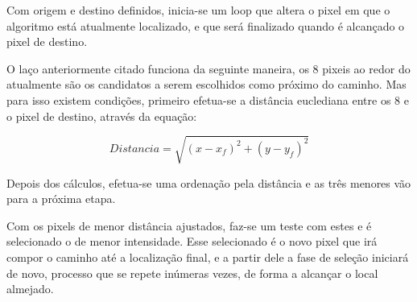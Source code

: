 \documentclass[conference]{IEEEtran}
\begin{document}
Com origem e destino definidos, inicia-se um loop que altera o pixel em que o algoritmo
está atualmente localizado, e que será finalizado quando é alcançado o pixel de destino.

O laço anteriormente citado funciona da seguinte maneira, os 8 pixeis ao redor do atualmente
são os candidatos a serem escolhidos como próximo do caminho. Mas para isso existem condições,
primeiro efetua-se a distância euclediana entre os 8 e o pixel de destino, através da equação:

\begin{equation}
    \label{eq6}
    Distancia = \sqrt{(x - x_{f})^2 + (y - y_{f})^2}
\end{equation}

Depois dos cálculos, efetua-se uma ordenação pela distância e as três menores vão
para a próxima etapa.

Com os pixels de menor distância ajustados, faz-se um teste com estes e é selecionado
o de menor intensidade. Esse selecionado é o novo pixel que irá compor o caminho até 
a localização final, e a partir dele a fase de seleção iniciará de novo, processo que se repete
inúmeras vezes, de forma a alcançar o local almejado.
%
%

\end{document}
